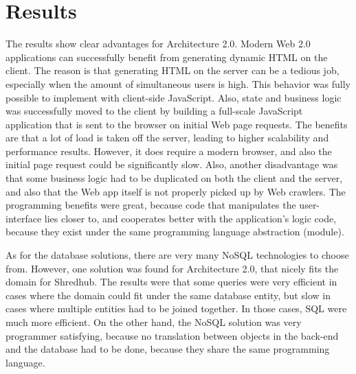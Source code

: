\section{Results}
The results show clear advantages for Architecture 2.0. Modern Web 2.0 applications can successfully benefit from generating dynamic HTML on the client. The reason is that generating HTML on the server can be a tedious job, especially when the amount of simultaneous users is high. This behavior was fully possible to implement with client-side JavaScript. Also, state and business logic was successfully moved to the client by building a full-scale JavaScript application that is sent to the browser on initial Web page requests. The benefits are that a lot of load is taken off the server, leading to higher scalability and performance results. However, it does require a modern browser, and also the initial page request could be significantly slow.  Also, another disadvantage was that some business logic had to be duplicated on both the client and the server, and also that the Web app itself is not properly picked up by Web crawlers. The programming benefits were great, because code that manipulates the user-interface lies closer to, and cooperates better with the application's logic code, because they exist under the same programming language abstraction (module).  

As for the database solutions, there are very many NoSQL technologies to choose from. However, one solution was found for Architecture 2.0, that nicely fits the domain for Shredhub. The results were that some queries were very efficient in cases where the domain could fit under the same database entity, but slow in cases where multiple entities had to be joined together. In those cases, SQL were much more efficient. On the other hand, the NoSQL solution was very programmer satisfying, because no translation between objects in the back-end and the database had to be done, because they share the same programming language. 
